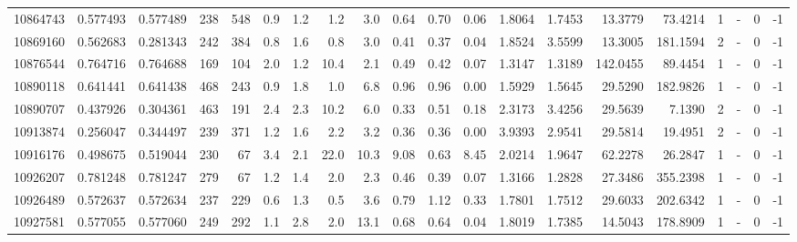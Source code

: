 \begin{tabular}{rrrrrrrrrrrrrrrrrlrl}
  10864743 & 0.577493 &   0.577489 &  238 &  548 &      0.9 &      1.2 &     1.2 &      3.0 &       0.64 &        0.70 &        0.06 &  1.8064 &  1.7453 &   13.3779 &   73.4214 &       1 &             - &        0 &        -1 \\
  10869160 & 0.562683 &   0.281343 &  242 &  384 &      0.8 &      1.6 &     0.8 &      3.0 &       0.41 &        0.37 &        0.04 &  1.8524 &  3.5599 &   13.3005 &  181.1594 &       2 &             - &        0 &        -1 \\
  10876544 & 0.764716 &   0.764688 &  169 &  104 &      2.0 &      1.2 &    10.4 &      2.1 &       0.49 &        0.42 &        0.07 &  1.3147 &  1.3189 &  142.0455 &   89.4454 &       1 &             - &        0 &        -1 \\
  10890118 & 0.641441 &   0.641438 &  468 &  243 &      0.9 &      1.8 &     1.0 &      6.8 &       0.96 &        0.96 &        0.00 &  1.5929 &  1.5645 &   29.5290 &  182.9826 &       1 &             - &        0 &        -1 \\
  10890707 & 0.437926 &   0.304361 &  463 &  191 &      2.4 &      2.3 &    10.2 &      6.0 &       0.33 &        0.51 &        0.18 &  2.3173 &  3.4256 &   29.5639 &    7.1390 &       2 &             - &        0 &        -1 \\
  10913874 & 0.256047 &   0.344497 &  239 &  371 &      1.2 &      1.6 &     2.2 &      3.2 &       0.36 &        0.36 &        0.00 &  3.9393 &  2.9541 &   29.5814 &   19.4951 &       2 &             - &        0 &        -1 \\
  10916176 & 0.498675 &   0.519044 &  230 &   67 &      3.4 &      2.1 &    22.0 &     10.3 &       9.08 &        0.63 &        8.45 &  2.0214 &  1.9647 &   62.2278 &   26.2847 &       1 &             - &        0 &        -1 \\
  10926207 & 0.781248 &   0.781247 &  279 &   67 &      1.2 &      1.4 &     2.0 &      2.3 &       0.46 &        0.39 &        0.07 &  1.3166 &  1.2828 &   27.3486 &  355.2398 &       1 &             - &        0 &        -1 \\
  10926489 & 0.572637 &   0.572634 &  237 &  229 &      0.6 &      1.3 &     0.5 &      3.6 &       0.79 &        1.12 &        0.33 &  1.7801 &  1.7512 &   29.6033 &  202.6342 &       1 &             - &        0 &        -1 \\
  10927581 & 0.577055 &   0.577060 &  249 &  292 &      1.1 &      2.8 &     2.0 &     13.1 &       0.68 &        0.64 &        0.04 &  1.8019 &  1.7385 &   14.5043 &  178.8909 &       1 &             - &        0 &        -1 \\

\end{tabular}
